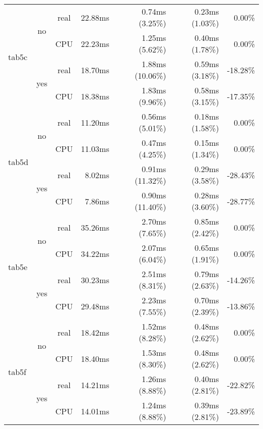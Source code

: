 \documentclass[en]{pracamgr}
\begin{document}
\begin{small}
\begin{longtable}{|l|c|c|r|r|r|r|}
\hline
\multirow{4}{*}{tab5c}    & \multirow{2}{*}{no}  & real & 22.88ms & 0.74ms (3.25\%) & 0.23ms (1.03\%) & 0.00\% \\*
                          &                      & CPU  & 22.23ms & 1.25ms (5.62\%) & 0.40ms (1.78\%) & 0.00\% \\*
                          \cline{2-7}
                          & \multirow{2}{*}{yes} & real & 18.70ms & 1.88ms (10.06\%) & 0.59ms (3.18\%) & -18.28\% \\*
                          &                      & CPU  & 18.38ms & 1.83ms (9.96\%) & 0.58ms (3.15\%) & -17.35\% \\
\hline
\multirow{4}{*}{tab5d}    & \multirow{2}{*}{no}  & real & 11.20ms & 0.56ms (5.01\%) & 0.18ms (1.58\%) & 0.00\% \\*
                          &                      & CPU  & 11.03ms & 0.47ms (4.25\%) & 0.15ms (1.34\%) & 0.00\% \\*
                          \cline{2-7}
                          & \multirow{2}{*}{yes} & real & 8.02ms & 0.91ms (11.32\%) & 0.29ms (3.58\%) & -28.43\% \\*
                          &                      & CPU  & 7.86ms & 0.90ms (11.40\%) & 0.28ms (3.60\%) & -28.77\% \\
\hline
\multirow{4}{*}{tab5e}    & \multirow{2}{*}{no}  & real & 35.26ms & 2.70ms (7.65\%) & 0.85ms (2.42\%) & 0.00\% \\*
                          &                      & CPU  & 34.22ms & 2.07ms (6.04\%) & 0.65ms (1.91\%) & 0.00\% \\*
                          \cline{2-7}
                          & \multirow{2}{*}{yes} & real & 30.23ms & 2.51ms (8.31\%) & 0.79ms (2.63\%) & -14.26\% \\*
                          &                      & CPU  & 29.48ms & 2.23ms (7.55\%) & 0.70ms (2.39\%) & -13.86\% \\
\hline
\multirow{4}{*}{tab5f}    & \multirow{2}{*}{no}  & real & 18.42ms & 1.52ms (8.28\%) & 0.48ms (2.62\%) & 0.00\% \\*
                          &                      & CPU  & 18.40ms & 1.53ms (8.30\%) & 0.48ms (2.62\%) & 0.00\% \\*
                          \cline{2-7}
                          & \multirow{2}{*}{yes} & real & 14.21ms & 1.26ms (8.88\%) & 0.40ms (2.81\%) & -22.82\% \\*
                          &                      & CPU  & 14.01ms & 1.24ms (8.88\%) & 0.39ms (2.81\%) & -23.89\% \\

\end{longtable}
\end{small}
\end{document}
